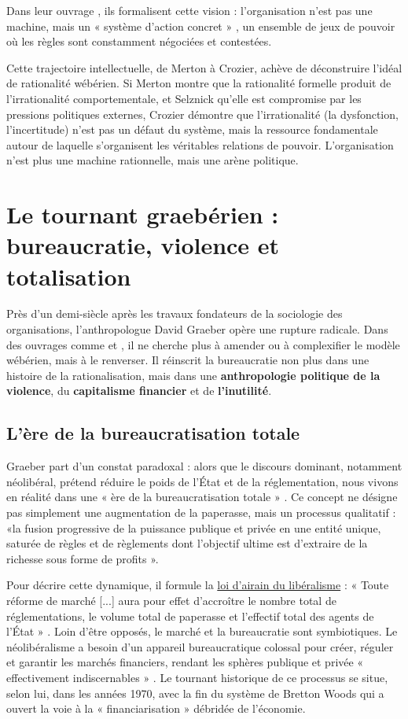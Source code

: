 Dans leur ouvrage \citep{CrozierFriedberg1977}, ils formalisent cette vision : l'organisation n'est pas une machine, mais un « système d'action concret » , un ensemble de jeux de pouvoir où les règles sont constamment négociées et contestées.

Cette trajectoire intellectuelle, de Merton à Crozier, achève de déconstruire l'idéal de rationalité wébérien. Si Merton montre que la rationalité formelle produit de l'irrationalité comportementale, et Selznick qu'elle est compromise par les pressions politiques externes, Crozier démontre que l'irrationalité (la dysfonction, l'incertitude) n'est pas un défaut du système, mais la ressource fondamentale autour de laquelle s'organisent les véritables relations de pouvoir. L'organisation n'est plus une machine rationnelle, mais une arène politique.

\chapter{Le tournant graebérien : bureaucratie, violence et totalisation}
Près d'un demi-siècle après les travaux fondateurs de la sociologie des organisations, l'anthropologue David Graeber opère une rupture radicale. Dans des ouvrages comme \citep{Graeber2015} et \citep{Graeber2018}, il ne cherche plus à amender ou à complexifier le modèle wébérien, mais à le renverser. Il réinscrit la bureaucratie non plus dans une histoire de la rationalisation, mais dans une \textbf{anthropologie politique de la violence}, du \textbf{capitalisme financier} et de \textbf{l'inutilité}.

\section{L'ère de la bureaucratisation totale}

Graeber part d'un constat paradoxal : alors que le discours dominant, notamment néolibéral, prétend réduire le poids de l'État et de la réglementation, nous vivons en réalité dans une « ère de la bureaucratisation totale » . Ce concept ne désigne pas simplement une augmentation de la paperasse, mais un processus qualitatif : «la fusion progressive de la puissance publique et privée en une entité unique, saturée de règles et de règlements dont l'objectif ultime est d'extraire de la richesse sous forme de profits ».

Pour décrire cette dynamique, il formule la \underline{loi d'airain du libéralisme}  : « Toute réforme de marché [...] aura pour effet d'accroître le nombre total de réglementations, le volume total de paperasse et l'effectif total des agents de l'État » \citet{Graeber2015}. Loin d'être opposés, le marché et la bureaucratie sont symbiotiques. Le néolibéralisme a besoin d'un appareil bureaucratique colossal pour créer, réguler et garantir les marchés financiers, rendant les sphères publique et privée « effectivement indiscernables » \citet{Graeber2015}. Le tournant historique de ce processus se situe, selon lui, dans les années 1970, avec la fin du système de Bretton Woods qui a ouvert la voie à la « financiarisation » \citet{Graeber2015} débridée de l'économie.


